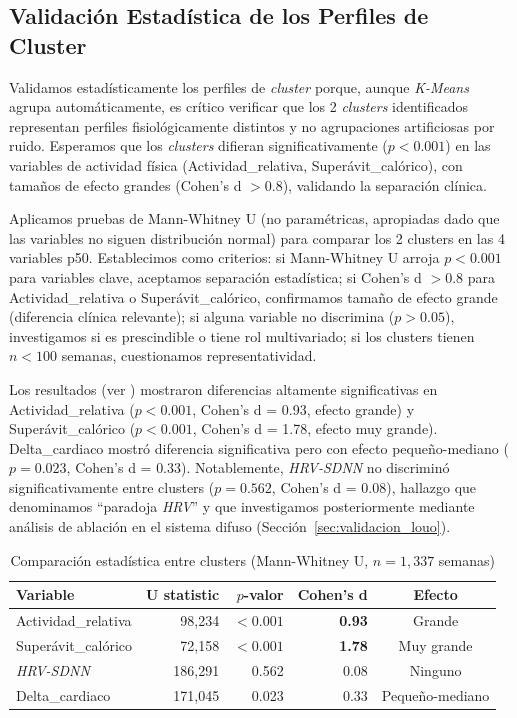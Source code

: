 \subsection{Validación Estadística de los Perfiles de Cluster}

Validamos estadísticamente los perfiles de \textit{cluster} porque, aunque \textit{K-Means} agrupa automáticamente, es crítico verificar que los 2 \textit{clusters} identificados representan perfiles fisiológicamente distintos y no agrupaciones artificiosas por ruido. Esperamos que los \textit{clusters} difieran significativamente ($p < 0.001$) en las variables de actividad física (Actividad\_relativa, Superávit\_calórico), con tamaños de efecto grandes (Cohen's d $> 0.8$), validando la separación clínica.

Aplicamos pruebas de Mann-Whitney U (no paramétricas, apropiadas dado que las variables no siguen distribución normal) para comparar los 2 clusters en las 4 variables p50. Establecimos como criterios: si Mann-Whitney U arroja $p < 0.001$ para variables clave, aceptamos separación estadística; si Cohen's d $> 0.8$ para Actividad\_relativa o Superávit\_calórico, confirmamos tamaño de efecto grande (diferencia clínica relevante); si alguna variable no discrimina ($p > 0.05$), investigamos si es prescindible o tiene rol multivariado; si los clusters tienen $n < 100$ semanas, cuestionamos representatividad.

Los resultados (ver ) mostraron diferencias altamente significativas en Actividad\_relativa ($p < 0.001$, Cohen's d = 0.93, efecto grande) y Superávit\_calórico ($p < 0.001$, Cohen's d = 1.78, efecto muy grande). Delta\_cardiaco mostró diferencia significativa pero con efecto pequeño-mediano ($p = 0.023$, Cohen's d = 0.33). Notablemente, \textit{HRV-SDNN} no discriminó significativamente entre clusters ($p = 0.562$, Cohen's d = 0.08), hallazgo que denominamos ``paradoja \textit{HRV}'' y que investigamos posteriormente mediante análisis de ablación en el sistema difuso (Sección~\ref{sec:validacion_louo}).

\begin{table}[H]
    \centering
    \caption{Comparación estadística entre clusters (Mann-Whitney U, $n=1,337$ semanas)}
    \label{tab:cluster_comparison}
    \small
    \begin{tabular}{@{}lrrrc@{}}
        \toprule
        \textbf{Variable} & \textbf{U statistic} & \textbf{$p$-valor} & \textbf{Cohen's d} & \textbf{Efecto} \\
        \midrule
        Actividad\_relativa     & 98,234  & $< 0.001$ & \textbf{0.93} & Grande \\
        Superávit\_calórico     & 72,158  & $< 0.001$ & \textbf{1.78} & Muy grande \\
        \textit{HRV-SDNN}               & 186,291 & 0.562     & 0.08 & Ninguno \\
        Delta\_cardiaco         & 171,045 & 0.023     & 0.33 & Pequeño-mediano \\
        \bottomrule
    \end{tabular}
\end{table}

